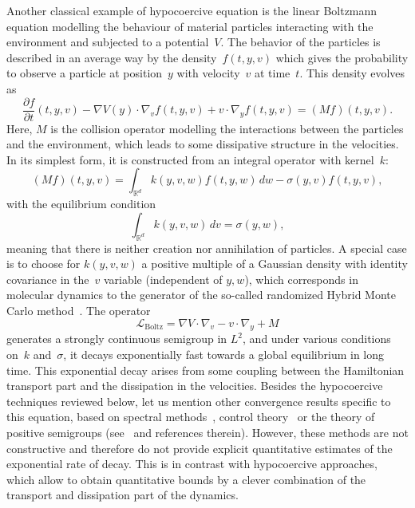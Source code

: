\documentclass[10pt]{amsart}
\theoremstyle{definition}\newtheorem{defi}[theo]{Definition}\newtheorem{rema}[theo]{Remark}\newtheorem{exam}[theo]{Example}\newtheorem{exem}[theo]{Example}\newtheorem{nota}[theo]{Notation}
\newcommand{\Boltz}{\mathrm{Boltz}}
\newcommand{\cL}{\mathcal{L}}
\newcommand{\R}{\mathbb{R}}
\begin{document}
Another classical example of hypocoercive equation is the linear Boltzmann equation modelling the behaviour of material particles interacting with the environment and subjected to a potential~$V$. The behavior of the particles is described in an average way by the density~$f(t,y,v)$ which gives the probability to observe a particle at position~$y$ with velocity~$v$ at time~$t$. This density evolves as
\begin{equation}\label{eq:Boltzmann_eq}
\frac{\partial f}{\partial t}(t,y,v) - \nabla V(y) \cdot \nabla_v f(t,y,v) + v\cdot\nabla_y f(t,y,v) = (M f)(t,y,v).
\end{equation}
Here, $M$ is the collision operator modelling the interactions between the particles and the environment, which leads to some dissipative structure in the velocities. In its simplest form, it is constructed from an integral operator with kernel~$k$:
\[
(M f)(t,y,v) = \int_{\R^d}k(y,v,w)f(t,y,w) \, dw -\sigma (y,v)f(t,y,v),
\]
with the equilibrium condition
\[
\int_{\R^d}k(y,v,w)\, dv = \sigma (y,w),
\]
meaning that there is neither creation nor annihilation of particles. A special case is to choose for $k(y,v,w)$ a positive multiple of a Gaussian density with identity covariance in the~$v$ variable (independent of $y,w$), which corresponds in molecular dynamics to the generator of the so-called randomized Hybrid Monte Carlo method~\cite{BRSS17}. The operator
\[
\cL_{\Boltz} = \nabla V\cdot \nabla_v-v\cdot\nabla_y + M
\]
generates a strongly continuous semigroup in $L^{2}$, and under various conditions on~$k$ and~$\sigma$, it decays exponentially fast towards a global equilibrium in long time. This exponential decay arises from some coupling between the Hamiltonian transport part and the dissipation in the velocities. Besides the hypocoercive techniques reviewed below, let us mention other convergence results specific to this equation, based on spectral methods~\cite{Ukai74, Vidav70}, control theory~\cite{HKL15} or the theory of positive semigroups (see~\cite{BS13,Mokhtar14} and references therein). However, these methods are not constructive and therefore do not provide explicit quantitative estimates of the exponential rate of decay. This is in contrast with hypocoercive approaches, which allow to obtain quantitative bounds by a clever combination of the transport and dissipation part of the dynamics.
\vspace{20pt}
\pagebreak
\end{document}
